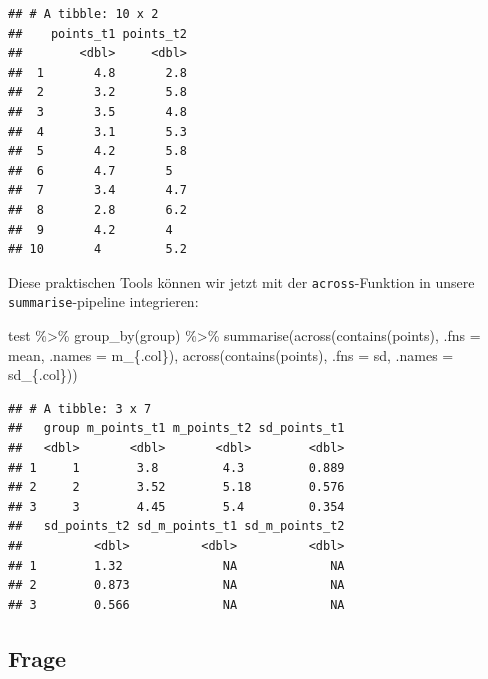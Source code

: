 \documentclass[
]{book}
\newenvironment{Shaded}{\begin{snugshade}}{\end{snugshade}}
\newcommand{\AttributeTok}[1]{\textcolor[rgb]{0.77,0.63,0.00}{#1}}
\newcommand{\FunctionTok}[1]{\textcolor[rgb]{0.00,0.00,0.00}{#1}}
\newcommand{\NormalTok}[1]{#1}
\newcommand{\SpecialCharTok}[1]{\textcolor[rgb]{0.00,0.00,0.00}{#1}}
\newcommand{\StringTok}[1]{\textcolor[rgb]{0.31,0.60,0.02}{#1}}
\begin{document}
\begin{verbatim}
## # A tibble: 10 x 2
##    points_t1 points_t2
##        <dbl>     <dbl>
##  1       4.8       2.8
##  2       3.2       5.8
##  3       3.5       4.8
##  4       3.1       5.3
##  5       4.2       5.8
##  6       4.7       5  
##  7       3.4       4.7
##  8       2.8       6.2
##  9       4.2       4  
## 10       4         5.2
\end{verbatim}

Diese praktischen Tools können wir jetzt mit der \texttt{across}-Funktion in unsere \texttt{summarise}-pipeline integrieren:

\begin{Shaded}
\begin{Highlighting}[]
\NormalTok{test }\SpecialCharTok{\%\textgreater{}\%} 
  \FunctionTok{group\_by}\NormalTok{(group) }\SpecialCharTok{\%\textgreater{}\%} 
  \FunctionTok{summarise}\NormalTok{(}\FunctionTok{across}\NormalTok{(}\FunctionTok{contains}\NormalTok{(}\StringTok{\textquotesingle{}points\textquotesingle{}}\NormalTok{),}
                   \AttributeTok{.fns =}\NormalTok{ mean,}
                   \AttributeTok{.names =} \StringTok{\textquotesingle{}m\_\{.col\}\textquotesingle{}}\NormalTok{),}
            \FunctionTok{across}\NormalTok{(}\FunctionTok{contains}\NormalTok{(}\StringTok{\textquotesingle{}points\textquotesingle{}}\NormalTok{),}
                   \AttributeTok{.fns =}\NormalTok{ sd,}
                   \AttributeTok{.names =} \StringTok{\textquotesingle{}sd\_\{.col\}\textquotesingle{}}\NormalTok{))}
\end{Highlighting}
\end{Shaded}

\begin{verbatim}
## # A tibble: 3 x 7
##   group m_points_t1 m_points_t2 sd_points_t1
##   <dbl>       <dbl>       <dbl>        <dbl>
## 1     1        3.8         4.3         0.889
## 2     2        3.52        5.18        0.576
## 3     3        4.45        5.4         0.354
##   sd_points_t2 sd_m_points_t1 sd_m_points_t2
##          <dbl>          <dbl>          <dbl>
## 1        1.32              NA             NA
## 2        0.873             NA             NA
## 3        0.566             NA             NA
\end{verbatim}

\hypertarget{frage}{%
\subsection{Frage}\label{frage}}
\end{document}
